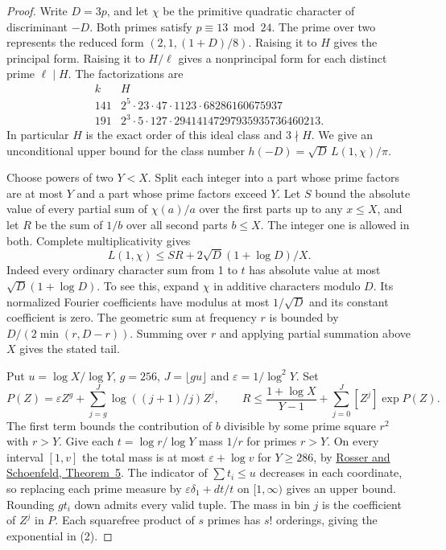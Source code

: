 \documentclass[11pt]{article}
\begin{document}
\begin{proof}
Write \(D=3p\), and let \(\chi\) be the primitive quadratic character
of discriminant \(-D\). Both primes satisfy \(p\equiv13\bmod24\).
The prime over two represents the reduced form \((2,1,(1+D)/8)\).
Raising it to \(H\) gives the principal form. Raising it to
\(H/\ell\) gives a nonprincipal form for each distinct prime
\(\ell\mid H\). The factorizations are
\[
 \begin{array}{r|l}
 k&H\\\hline
 141&2^5\cdot23\cdot47\cdot1123\cdot68286160675937\\
 191&2^3\cdot5\cdot127\cdot29414147297935935736460213 .
 \end{array}
\]
In particular \(H\) is the exact order of this ideal class and
\(3\nmid H\). We give an unconditional upper bound for the class
number \(h(-D)=\sqrt D\,L(1,\chi)/\pi\).

Choose powers of two \(Y<X\). Split each integer into a part whose
prime factors are at most \(Y\) and a part whose prime factors exceed
\(Y\). Let \(S\) bound the absolute value of every partial sum of
\(\chi(a)/a\) over the first parts up to any \(x\le X\), and let
\(R\) be the sum of \(1/b\) over all second parts \(b\le X\).
The integer one is allowed in both. Complete multiplicativity gives
\[
 L(1,\chi)\le SR+2\sqrt D(1+\log D)/X .                         \tag{1}
\]
Indeed every ordinary character sum from 1 to \(t\) has absolute
value at most \(\sqrt D(1+\log D)\). To see this, expand \(\chi\)
in additive characters modulo \(D\). Its normalized Fourier
coefficients have modulus at most \(1/\sqrt D\) and its constant
coefficient is zero. The geometric sum at frequency \(r\) is bounded
by \(D/(2\min(r,D-r))\). Summing over \(r\) and applying partial
summation above \(X\) gives the stated tail.

Put \(u=\log X/\log Y\), \(g=256\), \(J=\lfloor gu\rfloor\) and
\(\varepsilon=1/\log^2 Y\). Set
\[
 P(Z)=\varepsilon Z^g+\sum_{j=g}^{J}\log((j+1)/j)Z^j,\qquad
 R\le\frac{1+\log X}{Y-1}+\sum_{j=0}^{J}[Z^j]\exp P(Z).          \tag{2}
\]
The first term bounds the contribution of \(b\) divisible by some prime
square \(r^2\) with \(r>Y\). Give each \(t=\log r/\log Y\) mass \(1/r\)
for primes \(r>Y\). On every interval \([1,v]\) the total mass is at
most \(\varepsilon+\log v\) for \(Y\ge286\), by
\href{https://doi.org/10.1215/ijm/1255631807}{Rosser and Schoenfeld,
Theorem~5}. The indicator of \(\sum t_i\le u\) decreases in each
coordinate, so replacing each prime measure by
\(\varepsilon\delta_1+dt/t\) on \([1,\infty)\) gives an upper bound.
Rounding \(gt_i\) down admits every valid tuple. The mass in bin \(j\)
is the coefficient of \(Z^j\) in \(P\). Each squarefree product of
\(s\) primes has \(s!\) orderings, giving the exponential in (2).


\end{proof}
\end{document}
